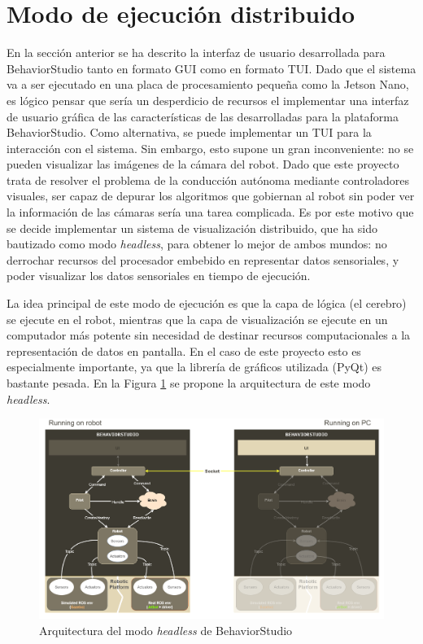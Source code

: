\section{Modo de ejecución distribuido}
\label{sec:headless}

En la sección anterior se ha descrito la interfaz de usuario desarrollada para BehaviorStudio tanto en formato GUI como en formato TUI. Dado que el sistema va a ser ejecutado en una placa de procesamiento pequeña como la Jetson Nano, es lógico pensar que sería un desperdicio de recursos el implementar una interfaz de usuario gráfica de las características de las desarrolladas para la plataforma BehaviorStudio. Como alternativa, se puede implementar un TUI para la interacción con el sistema. Sin embargo, esto supone un gran inconveniente: no se pueden visualizar las imágenes de la cámara del robot. Dado que este proyecto trata de resolver el problema de la conducción autónoma mediante controladores visuales, ser capaz de depurar los algoritmos que gobiernan al robot sin poder ver la información de las cámaras sería una tarea complicada. Es por este motivo que se decide implementar un sistema de visualización distribuido, que ha sido bautizado como modo \textit{headless}, para obtener lo mejor de ambos mundos: no derrochar recursos del procesador embebido en representar datos sensoriales, y poder visualizar los datos sensoriales en tiempo de ejecución.

La idea principal de este modo de ejecución es que la capa de lógica (el cerebro) se ejecute en el robot, mientras que la capa de visualización se ejecute en un computador más potente sin necesidad de destinar recursos computacionales a la representación de datos en pantalla. En el caso de este proyecto esto es especialmente importante, ya que la librería de gráficos utilizada (PyQt) es bastante pesada. En la Figura \ref{fig:headless} se propone la arquitectura de este modo \textit{headless}.

\begin{figure}
  \centering
  \includegraphics[width=1\linewidth]{img/headless.png}
  \caption{Arquitectura del modo \textit{headless} de BehaviorStudio}
  \label{fig:headless}
\end{figure}

